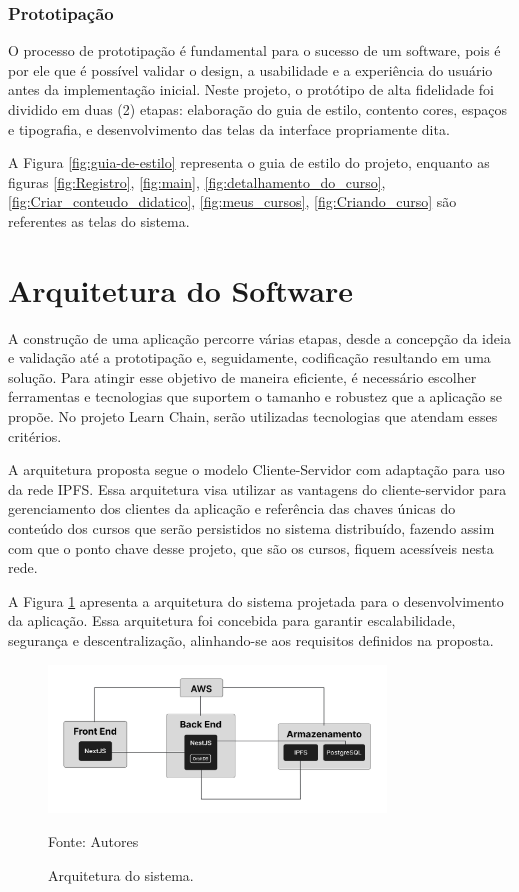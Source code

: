         \subsubsection{Prototipação}

        O processo de prototipação é fundamental para o sucesso de um software, pois é por ele que é possível validar o design, a usabilidade e a experiência do usuário antes da implementação inicial. Neste projeto, o protótipo de alta fidelidade foi dividido em duas (2) etapas: elaboração do guia de estilo, contento cores, espaços e tipografia, e desenvolvimento das telas da interface propriamente dita. 

        A Figura \ref{fig:guia-de-estilo} representa o guia de estilo do projeto, enquanto as figuras \ref{fig:Registro}, \ref{fig:main}, \ref{fig:detalhamento_do_curso}, \ref{fig:Criar_conteudo_didatico}, \ref{fig:meus_cursos}, \ref{fig:Criando_curso} são referentes as telas do sistema.

\section{Arquitetura do Software}
A construção de uma aplicação percorre várias etapas, desde a concepção da ideia e validação até a prototipação e, seguidamente, codificação resultando em uma solução. Para atingir esse objetivo de maneira eficiente, é necessário escolher ferramentas e tecnologias que suportem  o tamanho e robustez que a aplicação se propõe. No projeto Learn Chain, serão utilizadas tecnologias que atendam esses critérios.

A arquitetura proposta segue o modelo Cliente-Servidor com adaptação para uso da rede IPFS. Essa arquitetura visa utilizar as vantagens do cliente-servidor para gerenciamento dos clientes da aplicação e referência das chaves únicas do conteúdo dos cursos que serão persistidos no sistema distribuído, fazendo assim com que o ponto chave desse projeto, que são os cursos, fiquem acessíveis nesta rede.

A Figura \ref{fig:arquitetura_sistema} apresenta a arquitetura do sistema projetada para o desenvolvimento da aplicação. Essa arquitetura foi concebida para garantir escalabilidade, segurança e descentralização, alinhando-se aos requisitos definidos na proposta.

\begin{figure}[h]
    \centering
    \caption{Arquitetura do sistema.}
    \includegraphics[width=0.8\textwidth]{figuras/arquitetura.png}
    \begin{center}
        {\footnotesize Fonte: Autores}
    \end{center}
    \label{fig:arquitetura_sistema}
\end{figure}

